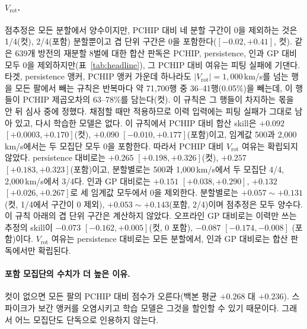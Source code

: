 \documentclass[10pt,twocolumn,letterpaper]{article}
\newcommand{\Vrot}{\ensuremath{V_\mathrm{rot}}}
\begin{document}
\paragraph{\Vrot{}.} 점추정은 모든 분할에서 양수이지만, PCHIP 대비 네 분할 구간이 0을
제외하는 것은 1/4(컷), 2/4(포함) 분할뿐이고 겹 단위 구간은 0을 포함한다($[-0.02, +0.41]$,
컷). 같은 639개 방전의 재분할 8벌에 대한 합산 판독은 PCHIP, persistence, 인과 GP 대비 모두
0을 제외하지만(표~\ref{tab:headline}), 그 PCHIP 대비 여유는 피팅 실패에 기댄다. 타겟,
persistence 앵커, PCHIP 앵커 가운데 하나라도 $|\Vrot| = 1{,}000$\,km/s를 넘는 행을 모든
팔에서 빼는 규칙은 반복마다 약 71{,}700행 중 36--41행(0.05\%)을 빼는데, 이 행들이 PCHIP
제곱오차의 63--78\%를 담는다(컷). 이 규칙은 그 행들이 차지하는 몫을 안 뒤 심사 중에 정했다.
채점할 때만 적용하므로 이력 입력에는 피팅 실패가 그대로 남아 있고, 다시 학습한 모델은 없다.
이 규칙에서 PCHIP 대비 합산 skill은 $+0.092$ $[+0.0003, +0.170]$(컷), $+0.090$
$[-0.010, +0.177]$(포함)이고, 임계값 500과 2{,}000\,km/s에서는 두 모집단 모두 0을 포함한다.
따라서 PCHIP 대비 \Vrot{} 여유는 확립되지 않았다. persistence 대비로는 $+0.265$
$[+0.198, +0.326]$(컷), $+0.257$ $[+0.183, +0.323]$(포함)이고, 분할별로는 500과
1{,}000\,km/s에서 두 모집단 4/4, 2{,}000\,km/s에서 3/4다. 인과 GP 대비로는 $+0.151$
$[+0.038, +0.290]$, $+0.132$ $[+0.026, +0.267]$로 세 임계값 모두에서 0을 제외한다. 분할별로는
$+0.057\sim+0.131$(컷, 1/4에서 구간이 0 제외), $+0.053\sim+0.143$(포함, 2/4)이며 점추정은
모두 양수다. 이 규칙 아래의 겹 단위 구간은 계산하지 않았다. 오프라인 GP 대비로는 이력만
쓰는 추정의 skill이 $-0.073$ $[-0.162, +0.005]$(컷, 0 포함), $-0.087$ $[-0.174, -0.008]$
(포함)이다. \Vrot{} 여유는 persistence 대비로는 모든 분할에서, 인과 GP 대비로는 합산
판독에서만 확립된다.

\paragraph{포함 모집단의 수치가 더 높은 이유.} 컷이 없으면 모든 팔의 PCHIP 대비 점수가
오른다(백본 평균 $+0.268$ 대 $+0.236$). 스파이크가 보간 앵커를 오염시키고 학습 모델은
그것을 할인할 수 있기 때문이다. 그래서 어느 모집단도 단독으로 인용하지 않는다.
\end{document}
